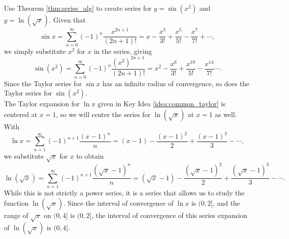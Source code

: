 {Use Theorem \ref{thm:series_alg} to create series for $y=\sin(x^2)$ and $y=\ln (\sqrt{x})$. 
}
{Given that 
$$\sin x = \sum_{n=0}^\infty (-1)^n\frac{x^{2n+1}}{(2n+1)!} = x-\frac{x^3}{3!}+\frac{x^5}{5!} -\frac{x^7}{7!}+\cdots,$$
we simply substitute $x^2$ for $x$ in the series, giving
$$\sin (x^2) = \sum_{n=0}^\infty (-1)^n\frac{(x^2)^{2n+1}}{(2n+1)!} = x^2-\frac{x^6}{3!}+\frac{x^{10}}{5!} -\frac{x^{14}}{7!}\cdots.$$
Since the Taylor series for $\sin x$ has an infinite radius of convergence, so does the Taylor series for $\sin(x^2)$.\\

The Taylor expansion for $\ln x$ given in Key Idea \ref{idea:common_taylor} is centered at $x=1$, so we will center the series for $\ln (\sqrt{x})$ at $x=1$ as well.
With 
$$\ln x = \sum_{n=1}^\infty(-1)^{n+1}\frac{(x-1)^n}{n} = (x-1)- \frac{(x-1)^2}{2} +\frac{(x-1)^3}{3}-\cdots,$$
we substitute $\sqrt{x}$ for $x$ to obtain
$$\ln (\sqrt{x}) = \sum_{n=1}^\infty(-1)^{n+1}\frac{(\sqrt{x}-1)^n}{n} = (\sqrt{x}-1)- \frac{(\sqrt{x}-1)^2}{2} +\frac{(\sqrt{x}-1)^3}{3}-\cdots.$$
While this is not strictly a power series, it is a series that allows us to study the function $\ln(\sqrt{x})$. Since the interval of convergence of $\ln x$ is $(0,2]$, and the range of $\sqrt{x}$ on $(0,4]$ is $(0,2]$, the interval of convergence of this series expansion of $\ln(\sqrt{x})$ is $(0,4]$.
}\\


